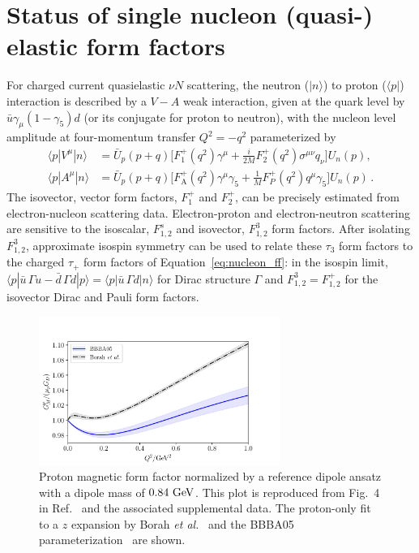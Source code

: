 \documentclass{ar-1col}
\begin{document}
\section{Status of single nucleon (quasi-) elastic form factors\label{sec:sof}}

For charged current quasielastic $\nu N$ scattering,
the neutron ($|n\rangle$) to proton ($\langle p|$)
interaction is described by a $V-A$ weak interaction, given at the quark level by
$\bar{u}\gamma_\mu(1- \gamma_5)d$ (or its conjugate for proton to neutron), with the nucleon level amplitude at four-momentum transfer $Q^2 = -q^2$ parameterized by
\begin{align}\label{eq:nucleon_ff}
\langle p | V^\mu | n \rangle
    &= \bar{U}_p(p+q) \Big[
        F_1^+(q^2) \gamma^\mu
        +\frac{i}{2M} F_2^+(q^2) \sigma^{\mu\nu} q_\nu
    \Big] U_n(p),
\nonumber\\
\langle p | A^\mu | n \rangle
    &= \bar{U}_p(p+q) \Big[
        F_{\mathrm{A}}^+(q^2) \gamma^\mu \gamma_5
        +\frac{1}{M} F_P^+(q^2) q^\mu \gamma_5
    \Big] U_n(p)\, .
\end{align}
The isovector, vector form factors, $F_1^+$ and $F_2^+$, can be precisely estimated from electron-nucleon scattering data.
Electron-proton and electron-neutron scattering are sensitive to the isoscalar, $F_{1,2}^s$ and isovector, $F_{1,2}^3$ form factors.  After isolating $F_{1,2}^3$, approximate isospin symmetry can be used to relate these $\tau_3$ form factors to the charged $\tau_+$ form factors of Equation~\eqref{eq:nucleon_ff}: in the isospin limit, $\langle p| \bar{u}\, \Gamma u - \bar{d}\, \Gamma d |p\rangle = \langle p| \bar{u}\, \Gamma d |n\rangle$
 for Dirac structure $\Gamma$ and $F_{1,2}^3 = F_{1,2}^+$
 for the isovector Dirac and Pauli form factors.
\begin{figure}
 \centering
 \includegraphics[width=0.7\textwidth]{plots/proton_magnetic-standalone.pdf}
 \vspace{4pt}
\caption{
Proton magnetic form factor normalized by a reference dipole ansatz
with a dipole mass of $0.84~{\rm GeV}$.
This plot is reproduced from Fig.~4 in Ref.~\cite{Borah:2020gte}
 and the associated supplemental data.
The proton-only fit to a $z$ expansion by Borah {\it et al.}~\cite{Borah:2020gte}
and the BBBA05 parameterization~\cite{Bradford:2006yz} are shown.
\label{fig:protonmagneticff}
}
\end{figure}
\end{document}
